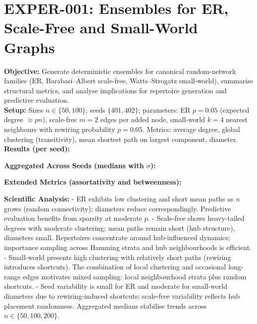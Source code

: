 \documentclass{article}
\begin{document}
\section{EXPER-001: Ensembles for ER, Scale-Free and Small-World Graphs}
\textbf{Objective:} Generate deterministic ensembles for canonical random-network families (ER, Barabasi–Albert scale-free, Watts–Strogatz small-world), summarise structural metrics, and analyse implications for repertoire generation and predictive evaluation.\\
\textbf{Setup:} Sizes $n\in\{50,100\}$; seeds $\{401,402\}$; parameters: ER $p=0.05$ (expected degree $\approx pn$), scale-free $m=2$ edges per added node, small-world $k=4$ nearest neighbours with rewiring probability $p=0.05$. Metrics: average degree, global clustering (transitivity), mean shortest path on largest component, diameter.\\
\textbf{Results (per seed):}\\
\begin{center}
\end{center}
\textbf{Aggregated Across Seeds (medians with $\sigma$):}\\
\begin{center}
\end{center}
\textbf{Extended Metrics (assortativity and betweenness):}\\
\begin{center}
\end{center}
\textbf{Scientific Analysis:}
- ER exhibits low clustering and short mean paths as $n$ grows (random connectivity); diameters reduce correspondingly. Predictive evaluation benefits from sparsity at moderate $p$.
- Scale-free shows heavy-tailed degrees with moderate clustering; mean paths remain short (hub structure), diameters small. Repertoires concentrate around hub-influenced dynamics; importance sampling across Hamming strata and hub neighbourhoods is efficient.
- Small-world presents high clustering with relatively short paths (rewiring introduces shortcuts). The combination of local clustering and occasional long-range edges motivates mixed sampling: local neighbourhood strata plus random shortcuts.
- Seed variability is small for ER and moderate for small-world diameters due to rewiring-induced shortcuts; scale-free variability reflects hub placement randomness. Aggregated medians stabilise trends across $n\in\{50,100,200\}$.
\end{document}
